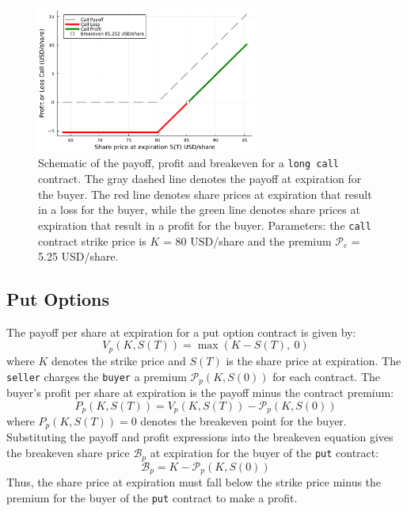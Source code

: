 \documentclass[11pt]{article}
\theoremstyle{definition}
\begin{document}
\begin{figure}[ht]
    \centering
    \includegraphics[width=0.65\textwidth]{./figs/Fig-Example-Call-K80-62DTE.pdf}
    \caption{Schematic of the payoff, profit and breakeven for a \texttt{long call} 
	contract. The gray dashed line denotes the payoff at expiration for the buyer.
	The red line denotes share prices at expiration that result in a loss for the buyer, 
	while the green line denotes share prices at expiration that result in a profit for the buyer.
	Parameters: the \texttt{call} 
	contract strike price is $K$ = 80 USD/share and the premium $\mathcal{P}_{c}$ = 5.25 USD/share.}\label{fig:call-payoff-profit-breakeven-diagram}
\end{figure}


\subsection*{Put Options}
The payoff per share at expiration for a put option contract is given by:
\begin{equation}
V_{p}(K,S(T)) = \max\left(K - S(T),~0\right)
\end{equation}
where $K$ denotes the strike price and $S(T)$ is the share price at expiration. 
The \texttt{seller} charges the \texttt{buyer} a premium $\mathcal{P}_{p}(K,S(0))$ for each contract.
The buyer's profit per share at expiration is the payoff minus the contract premium:
\begin{equation}
P_{p}(K,S(T)) = V_{p}(K,S(T)) -  \mathcal{P}_{p}(K,S(0))
\end{equation}
where $P_{p}(K,S(T)) = 0$ denotes the breakeven point for the buyer. 
Substituting the payoff and profit expressions into the breakeven equation gives the breakeven share price $\mathcal{B}_{p}$ at expiration for the buyer 
of the \texttt{put} contract:
\begin{equation}
\mathcal{B}_{p} = K - \mathcal{P}_{p}(K,S(0))
\end{equation}
Thus, the share price at expiration must fall below the strike price minus the premium for the buyer of the \texttt{put} 
contract to make a profit.
\end{document}
